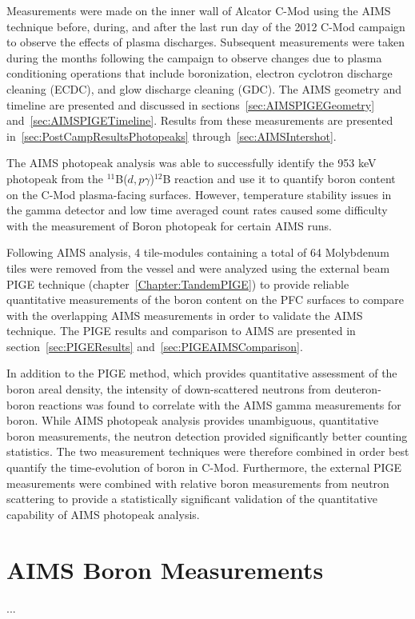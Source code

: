 \documentclass[final,3p,times,twocolumn]{elsarticle}
\begin{document}
Measurements were made on the inner wall of Alcator C-Mod using the AIMS technique before, during, and after the last run day of the 2012 C-Mod campaign to observe the effects of plasma discharges.  Subsequent measurements were taken during the months following the campaign to observe changes due to plasma conditioning operations that include boronization, electron cyclotron discharge cleaning (ECDC), and glow discharge cleaning (GDC).  The AIMS geometry and timeline are presented and discussed in sections~\ref{sec:AIMSPIGEGeometry} and~\ref{sec:AIMSPIGETimeline}.  Results from these measurements are presented in~\ref{sec:PostCampResultsPhotopeaks} through~\ref{sec:AIMSIntershot}.  

The AIMS photopeak analysis was able to successfully identify the 953 keV photopeak from the $^{11}$B($d,p\gamma$)$^{12}$B reaction and use it to quantify boron content on the C-Mod plasma-facing surfaces.  However, temperature stability issues in the gamma detector and low time averaged count rates caused some difficulty with the measurement of Boron photopeak for certain AIMS runs. 

Following AIMS analysis, 4 tile-modules containing a total of 64 Molybdenum tiles were removed from the vessel and were analyzed using the external beam PIGE technique (chapter~\ref{Chapter:TandemPIGE}) to provide reliable quantitative measurements of the boron content on the PFC surfaces to compare with the overlapping AIMS measurements in order to validate the AIMS technique.  The PIGE results and comparison to AIMS are presented in section~\ref{sec:PIGEResults} and~\ref{sec:PIGEAIMSComparison}.  

In addition to the PIGE method, which provides quantitative assessment of the boron areal density, the intensity of down-scattered neutrons from deuteron-boron reactions was found to correlate with the AIMS gamma measurements for boron.  While AIMS photopeak analysis provides unambiguous, quantitative boron measurements, the neutron detection provided significantly better counting statistics.  The two measurement techniques were therefore combined in order best quantify the time-evolution of boron in C-Mod.  Furthermore, the external PIGE measurements were combined with relative boron measurements from neutron scattering to provide a statistically significant validation of the quantitative capability of AIMS photopeak analysis.

\section{AIMS Boron Measurements}
...
\end{document}
